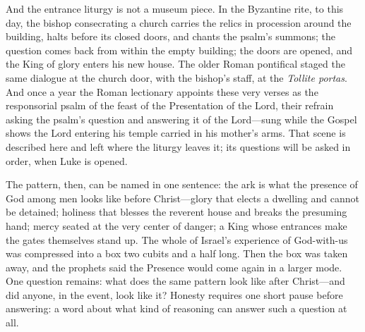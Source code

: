And the entrance liturgy is not a museum piece. In the Byzantine rite,
to this day, the bishop consecrating a church carries the relics in
procession around the building, halts before its closed doors, and
chants the psalm's summons; the question comes back from within the
empty building; the doors are opened, and the King of glory enters his
new house. The older Roman pontifical staged the same dialogue at the
church door, with the bishop's staff, at the \emph{Tollite portas}. And
once a year the Roman lectionary appoints these very verses as the
responsorial psalm of the feast of the Presentation of the Lord, their
refrain asking the psalm's question and answering it of the Lord---sung
while the Gospel shows the Lord entering his temple carried in his
mother's arms. That scene is
described here and left where the liturgy leaves it; its questions will
be asked in order, when Luke is opened.

The pattern, then, can be named in one sentence: the ark is what the
presence of God among men looks like before Christ---glory that elects
a dwelling and cannot be detained; holiness that blesses the reverent
house and breaks the presuming hand; mercy seated at the very center of
danger; a King whose entrances make the gates themselves stand up. The
whole of Israel's experience of God-with-us was compressed into a box
two cubits and a half long. Then the box was taken away, and the
prophets said the Presence would come again in a larger mode. One
question remains: what does the same pattern look like after
Christ---and did anyone, in the event, look like it? Honesty requires
one short pause before answering: a word about what kind of reasoning
can answer such a question at all.
